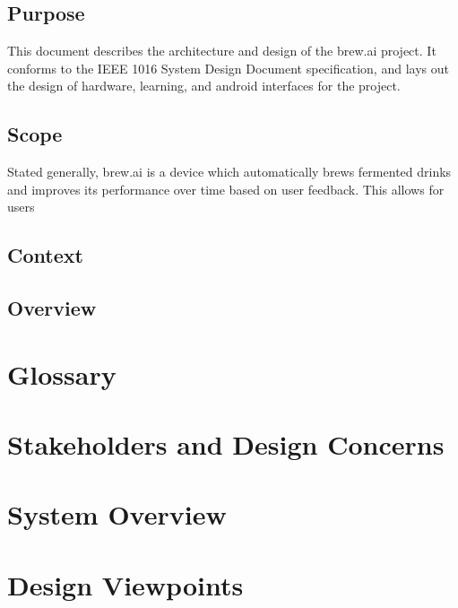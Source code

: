 \documentclass[draftclsnofoot,onecolumn,letterpaper,10pt]{IEEEtran}
\begin{document}
\subsection{Purpose}
This document describes the architecture and design of the brew.ai project.
It conforms to the IEEE 1016 System Design Document specification, and lays out the design of hardware, learning, and android interfaces for the project.

\subsection{Scope}
Stated generally, brew.ai is a device which automatically brews fermented drinks and improves its performance over time based on user feedback.
This allows for users 
\subsection{Context}
\subsection{Overview}


\section{Glossary}

\section{Stakeholders and Design Concerns}

\section{System Overview}

\section{Design Viewpoints}
\end{document}
